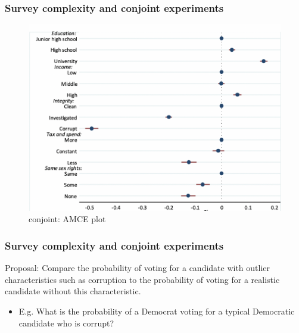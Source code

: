 \documentclass[usenames,dvipsnames]{beamer}
\begin{document}
\begin{frame}
\frametitle{Survey complexity and conjoint experiments}

\begin{figure}[!hb]
\hspace*{-11mm}
\includegraphics[scale = 0.6]{fz_conjoint.png}
\vspace{0.2cm}
\caption{\citet{franchino2015voting} conjoint: AMCE plot}
\small
\vspace{-0.3cm}
\label{fig: fz_amce}
\end{figure}

\end{frame}

\begin{frame}
\frametitle{Survey complexity and conjoint experiments}
\textcolor{Cerulean}{Proposal}: Compare the probability of voting for a candidate with outlier characteristics such as corruption to the probability of voting for a realistic candidate without this characteristic.
\begin{itemize}
\item E.g. What is the probability of a Democrat voting for a typical Democratic candidate who is corrupt?
\end{itemize}

\end{frame}
\end{document}
